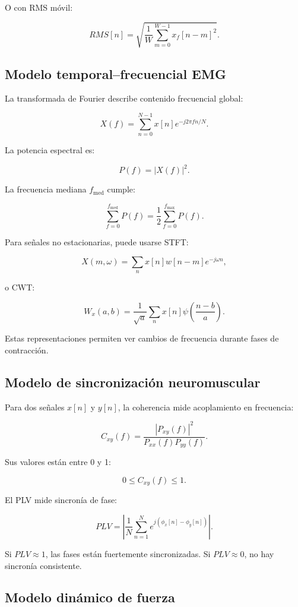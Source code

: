 \documentclass[12pt,a4paper]{article}
\begin{document}
O con RMS móvil:

\[
RMS[n]
=
\sqrt{
\frac{1}{W}
\sum_{m=0}^{W-1}
x_f[n-m]^2
}.
\]

\subsection{Modelo temporal--frecuencial EMG}

La transformada de Fourier describe contenido frecuencial global:

\[
X(f)=
\sum_{n=0}^{N-1}
x[n]e^{-j2\pi fn/N}.
\]

La potencia espectral es:

\[
P(f)=|X(f)|^2.
\]

La frecuencia mediana \(f_{\text{med}}\) cumple:

\[
\sum_{f=0}^{f_{\text{med}}}P(f)
=
\frac{1}{2}
\sum_{f=0}^{f_{\max}}P(f).
\]

Para señales no estacionarias, puede usarse STFT:

\[
X(m,\omega)
=
\sum_{n}
x[n]w[n-m]e^{-j\omega n},
\]

o CWT:

\[
W_x(a,b)
=
\frac{1}{\sqrt{a}}
\sum_n
x[n]\psi
\left(
\frac{n-b}{a}
\right).
\]

Estas representaciones permiten ver cambios de frecuencia durante fases de contracción.

\subsection{Modelo de sincronización neuromuscular}

Para dos señales \(x[n]\) y \(y[n]\), la coherencia mide acoplamiento en frecuencia:

\[
C_{xy}(f)
=
\frac{|P_{xy}(f)|^2}
{P_{xx}(f)P_{yy}(f)}.
\]

Sus valores están entre 0 y 1:

\[
0\leq C_{xy}(f)\leq 1.
\]

El PLV mide sincronía de fase:

\[
PLV =
\left|
\frac{1}{N}
\sum_{n=1}^{N}
e^{j(\phi_x[n]-\phi_y[n])}
\right|.
\]

Si \(PLV\approx 1\), las fases están fuertemente sincronizadas. Si \(PLV\approx 0\), no hay sincronía consistente.

\subsection{Modelo dinámico de fuerza}
\end{document}
